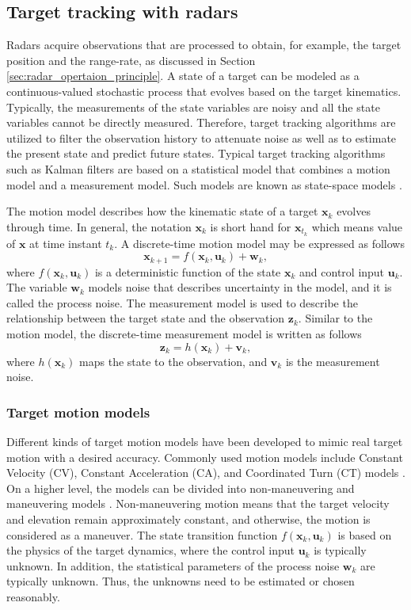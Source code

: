\documentclass[english, 12pt, a4paper, elec, utf8, a-1b, online]{aaltothesis}
\numberwithin{equation}{section}
\renewcommand{\vec}[1]{\mathbf{#1}}
\newcommand{\x}{\vec{x}_k}
\newcommand{\xnext}{\vec{x}_{k+1}}
\newcommand{\z}{\vec{z}_k}
\newcommand{\cinput}{\vec{u}_k}
\newcommand{\pnoise}{\vec{w}_k}
\newcommand{\onoise}{\vec{v}_k}
\begin{document}
\subsection{Target tracking with radars} \label{sec:Tracking}

Radars acquire observations that are processed to obtain, for example, the target position and the range-rate, as discussed in Section \ref{sec:radar_opertaion_principle}.
A state of a target can be modeled as a continuous-valued stochastic process that evolves based on the target kinematics. 
Typically, the measurements of the state variables are noisy and all the state variables cannot be directly measured.
Therefore, target tracking algorithms are utilized to filter the observation history to attenuate noise as well as to estimate the present state and predict future states.
Typical target tracking algorithms such as Kalman filters are based on a statistical model that combines a motion model and a measurement model. 
Such models are known as state-space models \cite{RongLi2003}.

The motion model describes how the kinematic state of a target $\x$ evolves through time.
In general, the notation $\x$ is short hand for $\vec{x}_{t_k}$ which means value of $\vec{x}$ at time instant $t_k$. 
A discrete-time motion model may be expressed as follows \cite{RongLi2003}
\begin{equation}\label{eq:spm_motion}
    \xnext  = f(\x, \cinput) + \pnoise,
\end{equation}
where $f(\x, \cinput)$ is a deterministic function of the state $\x$ and control input $\cinput$.
The variable $\pnoise$ models noise that describes uncertainty in the model, and it is called the process noise.
The measurement model is used to describe the relationship between the target state and the observation $\z$. 
Similar to the motion model, the discrete-time measurement model is written as follows \cite{RongLi2003}
\begin{equation}\label{eq:spm_obs}
    \z = h(\x) + \onoise,
\end{equation}
where $h(\x)$ maps the state to the observation, and $\onoise$ is the measurement noise.

\subsubsection{Target motion models} \label{sec:target_models}

Different kinds of target motion models have been developed to mimic real target motion with a desired accuracy. 
Commonly used motion models include Constant Velocity (CV), Constant Acceleration (CA), and Coordinated Turn (CT) models \cite{RongLi2003}.
On a higher level, the models can be divided into non-maneuvering and maneuvering models \cite{RongLi2003}. 
Non-maneuvering motion means that the target velocity and elevation remain approximately constant, and otherwise, the motion is considered as a maneuver.
The state transition function $f(\x, \cinput)$ is based on the physics of the target dynamics, where the control input $\cinput$ is typically unknown.
In addition, the statistical parameters of the process noise $\pnoise$ are typically unknown.
Thus, the unknowns need to be estimated or chosen reasonably.
\end{document}
